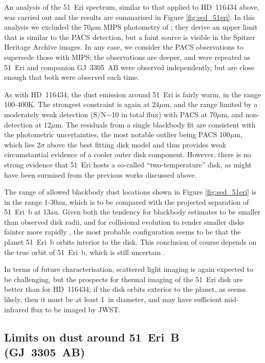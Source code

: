 \documentclass[a4paper,fleqn,usenatbib]{mnras}
\begin{document}
An analysis of the 51~Eri spectrum, similar to that applied to HD~116434
above, was carried out and the results are summarised in Figure
\ref{fig:sed_51eri}. In this analysis we excluded the 70$\mu$m MIPS
photometry of \citet{2008ApJ...681.1484R}; they derive an upper limit
that is similar to the PACS detection, but a faint source is visible in
the Spitzer Heritage Archive images. In any case, we consider the PACS
observations to supersede those with MIPS; the observations are deeper,
and were repeated as 51~Eri and companion GJ~3305~AB were observed
independently, but are close enough that both were observed each time.

As with HD~116434, the dust emission around 51~Eri is fairly warm, in
the range 100-400K. The strongest constraint is again at 24$\mu$m, and
the range limited by a moderately weak detection (S/N$\sim$10 in total
flux) with PACS at 70$\mu$m, and non-detection at 12$\mu$m. The
residuals from a single blackbody fit are consistent with the
photometric uncertainties, the most notable outlier being PACS
100$\mu$m, which lies 2$\sigma$ above the best fitting disk model and
thus provides weak circumstantial evidence of a cooler outer disk
component. However, there is no strong evidence that 51~Eri hosts a
so-called ``two-temperature'' disk, as might have been surmised from the
previous works discussed above.

The range of allowed blackbody dust locations shown in Figure
\ref{fig:sed_51eri} is in the range 1-30au, which is to be compared with
the projected separation of 51~Eri~b at 13au. Given both the tendency
for blackbody estimates to be smaller than observed disk radii, and for
collisional evolution to render smaller disks fainter more rapidly
\citep[e.g.][]{2003ApJ...598..626D,2007ApJ...658..569W}, the most
probable configuration seems to be that the planet 51~Eri~b orbits
interior to the disk. This conclusion of course depends on the true
orbit of 51~Eri~b, which is still uncertain \citep{2015ApJ...814L...3D}.

In terms of future characterisation, scattered light imaging is again
expected to be challenging, but the prospects for thermal imaging of the
51~Eri disk are better than for HD~116434; if the disk orbits exterior
to the planet, as seems likely, then it must be at least 1\arcsec~in
diameter, and may have sufficient mid-infrared flux to be imaged by
JWST.

\subsection{Limits on dust around 51~Eri~B (GJ~3305~AB)}
\end{document}
